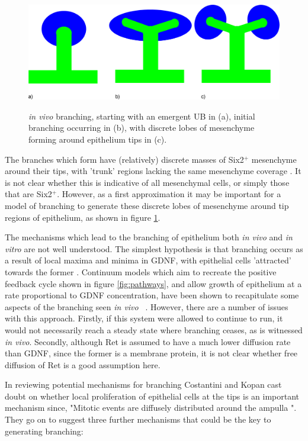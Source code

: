 \documentclass[pdftex,10pt,a4paper,twocolumn]{article}
\begin{document}
\begin{figure}[t] 
\centering
\scalebox{0.2} 
{\includegraphics{UB_branch.eps}}
\caption{\textit{in vivo} branching, starting with an emergent UB in (a), initial branching occurring in (b), with discrete lobes of mesenchyme forming around epithelium tips in (c).}\label{fig:branch}
\end{figure} 

The branches which form have (relatively) discrete masses of Six2$^+$ mesenchyme around their tips, with 'trunk' regions lacking the same mesenchyme coverage \cite{short2014global}. It is not clear whether this is indicative of all mesenchymal cells, or simply those that are Six2$^+$. However, as a first approximation it may be important for a model of branching to generate these discrete lobes of mesenchyme around tip regions of epithelium, as shown in figure \ref{fig:branch}. 

The mechanisms which lead to the branching of epithelium both \textit{in vivo} and \textit{in vitro} are not well understood. The simplest hypothesis is that branching occurs as a result of local maxima and minima in GDNF, with epithelial cells 'attracted' towards the former \cite{sariola2003novel}. Continuum models which aim to recreate the positive feedback cycle shown in figure \ref{fig:pathways}, and allow growth of epithelium at a rate proportional to GDNF concentration, have been shown to recapitulate some aspects of the branching seen \textit{in vivo} ~\cite{MenshykauDIber}. However, there are a number of issues with this approach. Firstly, if this system were allowed to continue to run, it would not necessarily reach a steady state where branching ceases, as is witnessed \textit{in vivo}. Secondly, although Ret is assumed to have a much lower diffusion rate than GDNF, since the former is a membrane protein, it is not clear whether free diffusion of Ret is a good assumption here. 

In reviewing potential mechanisms for branching Costantini and Kopan \cite{CostantiniFKopan2010} cast doubt on whether local proliferation of epithelial cells at the tips is an important mechanism since, "Mitotic events are diffusely distributed around the ampulla \cite{michael2004pattern}". They go on to suggest three further mechanisms that could be the key to generating branching:
\end{document}
